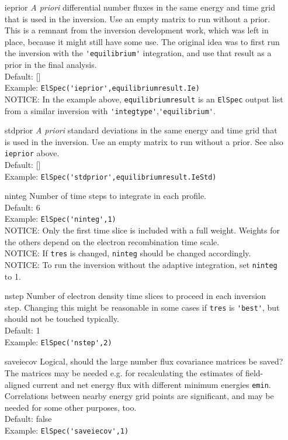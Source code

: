 \documentclass[12pt,a4paper]{report}
\begin{document}
\begin{itemize}
\item[ieprior] \emph{A priori} differential number fluxes in the same energy and time grid that is used in the inversion. Use an empty matrix to run without a prior.  This is a remnant from the inversion development work, which was left in place, because it might still have some use. The original idea was to first run the inversion with the \verb|'equilibrium'| integration, and use that result as a prior in the final analysis. \\
Default: []\\
Example: \verb|ElSpec('ieprior',equilibriumresult.Ie)| \\
NOTICE: In the example above, \verb|equilibriumresult| is an \verb|ElSpec| output list from a similar inversion with \verb|'integtype'|,\verb|'equilibrium'|.\\

\item[stdprior] \emph{A priori} standard deviations in the same energy and time grid that is used in the inversion. Use an empty matrix to run without a prior. See also \verb|ieprior| above. \\
Default: [] \\
Example: \verb|ElSpec('stdprior',equilibriumresult.IeStd)|\\

\item[ninteg] Number of time steps to integrate in each profile. \\
Default: 6 \\
Example: \verb|ElSpec('ninteg',1)| \\
NOTICE: Only the first time slice is included with a full weight. Weights for the others depend on the electron recombination time scale. \\
NOTICE: If \verb|tres| is changed, \verb|ninteg| should be changed accordingly. \\
NOTICE: To run the inversion without the adaptive integration, set \verb|ninteg| to 1. 

\item[nstep] Number of electron density time slices to proceed in each inversion step. Changing this might be reasonable in some cases if \verb|tres| is \verb|'best'|, but should not be touched typically.\\
Default: 1\\
Example: \verb|ElSpec('nstep',2)|\\

\item[saveiecov] Logical, should the large number flux covariance matrices be saved? The matrices may be needed e.g. for recalculating the estimates of field-aligned current and net energy flux with different minimum energies \verb|emin|. Correlations between nearby energy grid points are significant, and may be needed for some other purposes, too. \\
Default: false\\
Example: \verb|ElSpec('saveiecov',1)|\\

\end{itemize}
\end{document}
